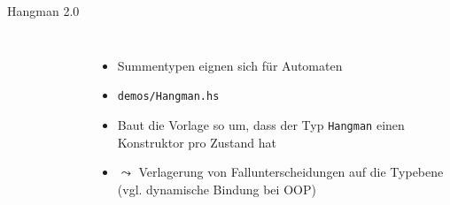 \documentclass{beamer}
\begin{document}
\begin{frame}{Hangman 2.0}

  \vfill
  
  \begin{columns}
    \begin{figure}
    \end{figure}
    \begin{itemize}
      \item Summentypen eignen sich für Automaten
      \item \texttt{demos/Hangman.hs}
      \item Baut die Vorlage so um, dass der Typ \texttt{Hangman} einen Konstruktor pro Zustand hat
      \item $\leadsto$ Verlagerung von Fallunterscheidungen auf die Typebene (vgl. dynamische Bindung bei OOP)
    \end{itemize}
  \end{columns}
\end{frame}
\end{document}

